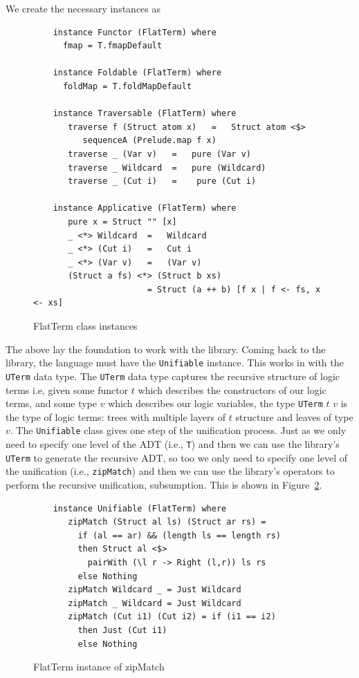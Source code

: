 \documentclass[thesis-solanki.tex]{subfiles}
\begin{document}
We create the necessary instances
as 
\begin{figure}
  \begin{verbatim}
    instance Functor (FlatTerm) where
      fmap = T.fmapDefault

    instance Foldable (FlatTerm) where
      foldMap = T.foldMapDefault

    instance Traversable (FlatTerm) where
       traverse f (Struct atom x)   =   Struct atom <$>
          sequenceA (Prelude.map f x)
       traverse _ (Var v)   =   pure (Var v)
       traverse _ Wildcard  =   pure (Wildcard)
       traverse _ (Cut i)   =    pure (Cut i)

    instance Applicative (FlatTerm) where
       pure x = Struct "" [x]
       _ <*> Wildcard  =   Wildcard
       _ <*> (Cut i)   =   Cut i
       _ <*> (Var v)   =   (Var v)
       (Struct a fs) <*> (Struct b xs)
                       = Struct (a ++ b) [f x | f <- fs, x <- xs]
  \end{verbatim}
  \caption{FlatTerm class instances}
  \label{tab:flat-term-class-inst}
\end{figure}

The above lay the foundation to work with the library.
Coming back to the library, the language must have the \Verb!Unifiable! instance.
This works in  with the \Verb!UTerm! data type.
The \Verb!UTerm! data type captures the recursive structure of logic terms i.e, given some functor \(t\) which describes the
constructors of our logic terms, and some type \(v\) which describes our logic variables, the type
\Verb!UTerm! \(t\) \(v\) is the
type of logic terms: trees with multiple layers of \(t\) structure and leaves of type \(v\).
The \Verb!Unifiable! class gives one step of the unification process.
Just as we only need to specify one level of the ADT (i.e., \Verb!T!) and then we can use the library's \Verb!UTerm! to generate
the recursive ADT, so too we only need to specify one level of the unification (i.e., \Verb!zipMatch!) and then we can use
the library's operators to perform the recursive unification, subsumption.
This is shown in Figure~\ref{tab:zipMatch}.
\begin{figure}
  \begin{verbatim}
    instance Unifiable (FlatTerm) where
       zipMatch (Struct al ls) (Struct ar rs) =
         if (al == ar) && (length ls == length rs)
         then Struct al <$>
           pairWith (\l r -> Right (l,r)) ls rs
         else Nothing
       zipMatch Wildcard _ = Just Wildcard
       zipMatch _ Wildcard = Just Wildcard
       zipMatch (Cut i1) (Cut i2) = if (i1 == i2)
         then Just (Cut i1)
         else Nothing
  \end{verbatim}
  \vspace*{-0.5\baselineskip}
  \caption{FlatTerm instance of zipMatch}
  \label{tab:zipMatch}
\end{figure}
\end{document}
